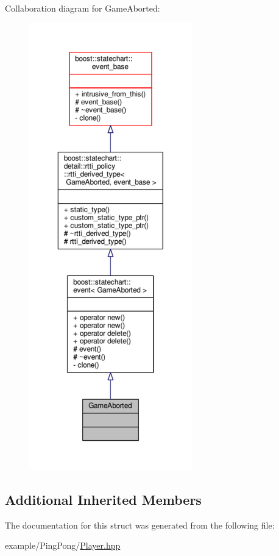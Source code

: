 Collaboration diagram for Game\+Aborted\+:
\nopagebreak
\begin{figure}[H]
\begin{center}
\leavevmode
\includegraphics[height=550pt]{struct_game_aborted__coll__graph}
\end{center}
\end{figure}
\subsection*{Additional Inherited Members}


The documentation for this struct was generated from the following file\+:\begin{DoxyCompactItemize}
\item 
example/\+Ping\+Pong/\mbox{\hyperlink{_player_8hpp}{Player.\+hpp}}\end{DoxyCompactItemize}
